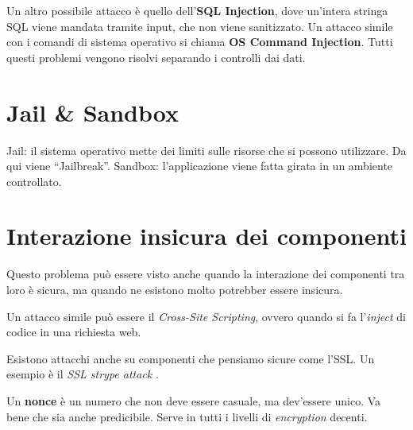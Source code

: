 Un altro possibile attacco è quello dell'\textbf{SQL Injection}, dove un'intera 
stringa SQL viene mandata tramite input, che non viene sanitizzato. Un attacco 
simile con i comandi di sistema operativo si chiama \textbf{OS Command 
Injection}. Tutti questi problemi vengono risolvi separando i controlli dai 
dati.

\section{Jail \& Sandbox}

Jail: il sistema operativo mette dei limiti sulle risorse che si possono 
utilizzare.
Da qui viene ``Jailbreak''.
Sandbox: l'applicazione viene fatta girata in un ambiente controllato.

\section{Interazione insicura dei componenti}

Questo problema può essere visto anche quando la interazione dei componenti tra 
loro è sicura, ma quando ne esistono molto potrebber essere insicura.

Un attacco simile può essere il \textit{Cross-Site Scripting}, ovvero quando si 
fa l'\textit{inject} di codice in una richiesta web.


Esistono attacchi anche su componenti che pensiamo sicure come l'SSL. Un esempio 
è il \textit{SSL strype attack} .

Un \textbf{nonce} è un numero che non deve essere casuale, ma dev'essere unico. 
Va bene che sia anche predicibile. Serve in tutti i livelli di 
\textit{encryption} decenti.

